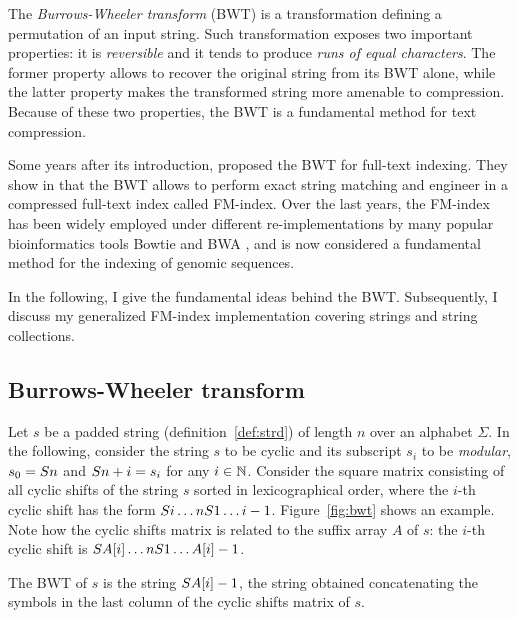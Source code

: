 The \emph{Burrows-Wheeler transform} (BWT) \citep{Burrows1994} is a transformation defining a permutation of an input string.
Such transformation exposes two important properties: it is \emph{reversible} and it tends to produce \emph{runs of equal characters}.
The former property allows to recover the original string from its BWT alone, while the latter property makes the transformed string more amenable to compression.
Because of these two properties, the BWT is a fundamental method for text compression.

Some years after its introduction, \citeauthor{Ferragina2000} proposed the BWT for full-text indexing.
They show in \citep{Ferragina2000} that the BWT allows to perform exact string matching and engineer in \citep{Ferragina2001} a compressed full-text index called FM-index.
Over the last years, the FM-index has been widely employed under different re-implementations by many popular bioinformatics tools \eg Bowtie \citep{Langmead2009} and BWA \citep{Li2009}, and is now considered a fundamental method for the indexing of genomic sequences.

In the following, I give the fundamental ideas behind the BWT.
Subsequently, I discuss my generalized FM-index implementation covering strings and string collections.

\subsection{Burrows-Wheeler transform}
\label{sec:index:bwt}

Let $s$ be a padded string (definition~\ref{def:strd}) of length $n$ over an alphabet $\Sigma$.
In the following, consider the string $s$ to be cyclic and its subscript $s_i$ to be \emph{modular}, \eg $s_0 = S{n}$ and $S{n+i} = s_i$ for any $i \in \mathbb {N}$.
Consider the square matrix consisting of all cyclic shifts of the string $s$ sorted in lexicographical order, where the $i$-th cyclic shift has the form $S{i \dots n} S{1 \dots i-1}$.
Figure~\ref{fig:bwt} shows an example.
Note how the cyclic shifts matrix is related to the suffix array $A$ of $s$: the $i$-th cyclic shift is $S{A[i] \dots n} S{1 \dots A[i]-1}$.

\begin{definition}
\label{def:bwt}
The BWT of $s$ is the string $S{A[i]-1}$, \ie the string obtained concatenating the symbols in the last column of the cyclic shifts matrix of $s$.
\end{definition}

